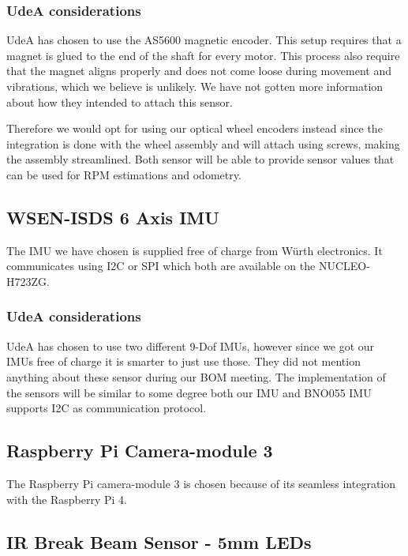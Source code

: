 \documentclass[a4paper,8pt]{article}
\begin{document}
  \subsubsection{UdeA considerations}

  UdeA has chosen to use the AS5600 magnetic encoder. This setup requires that a magnet is glued to the end of the shaft for every motor. This process also require that the magnet aligns properly and does not come loose during movement and vibrations, which we believe is unlikely. We have not gotten more information about how they intended to attach this sensor.

  Therefore we would opt for using our optical wheel encoders instead since the integration is done with the wheel assembly and will attach using screws, making the assembly streamlined. Both sensor will be able to provide sensor values that can be used for RPM estimations and odometry.

  \subsection{WSEN-ISDS 6 Axis IMU}

  The IMU we have chosen is supplied free of charge from Würth
  electronics. It communicates using I2C or SPI which both are available
  on the NUCLEO-H723ZG.

  \subsubsection{UdeA considerations}

  UdeA has chosen to use two different 9-Dof IMUs, however since we got our IMUs free of charge it is smarter to just use those. They did not mention anything about these sensor during our BOM meeting.
  The implementation of the sensors will be similar to some degree both our IMU and BNO055 IMU supports I2C as communication protocol.

  \subsection{Raspberry Pi Camera-module 3}

  The Raspberry Pi camera-module 3 is chosen because of its seamless
  integration with the Raspberry Pi 4.

  \subsection{IR Break Beam Sensor - 5mm LEDs}
\end{document}

